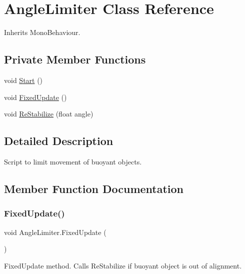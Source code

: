 \hypertarget{class_angle_limiter}{}\section{Angle\+Limiter Class Reference}
\label{class_angle_limiter}


Inherits Mono\+Behaviour.

\subsection*{Private Member Functions}
\begin{DoxyCompactItemize}
\item 
void \hyperlink{class_angle_limiter_a89e574bae24693203bab055a3a4fd184}{Start} ()
\item 
void \hyperlink{class_angle_limiter_afa4aa01bc9ab1fa09caede11d39cbaa4}{Fixed\+Update} ()
\item 
void \hyperlink{class_angle_limiter_afced607afbb55c3efcd949ee0e397b1a}{Re\+Stabilize} (float angle)
\end{DoxyCompactItemize}


\subsection{Detailed Description}
Script to limit movement of buoyant objects. 



\subsection{Member Function Documentation}
\mbox{\label{class_angle_limiter_afa4aa01bc9ab1fa09caede11d39cbaa4}} 
\subsubsection{\texorpdfstring{Fixed\+Update()}{FixedUpdate()}}
{\footnotesize\ttfamily void Angle\+Limiter.\+Fixed\+Update (\begin{DoxyParamCaption}{ }\end{DoxyParamCaption})\hspace{0.3cm}{\ttfamily [private]}}



Fixed\+Update method. Calls Re\+Stabilize if buoyant object is out of alignment. 

